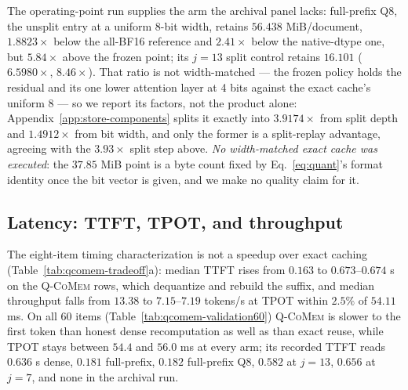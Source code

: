 \documentclass{article}
\newcommand{\qcomem}{\textsc{Q-CoMem}}
\begin{document}
The operating-point run supplies the arm the archival panel lacks: full-prefix
Q8, the unsplit entry at a uniform 8-bit width, retains $56.438$ MiB/document,
$1.8823\times$ below the all-BF16 reference and $2.41\times$ below the
native-dtype one, but $5.84\times$ above the frozen point; its $j=13$ split
control retains $16.101$ ($6.5980\times$, $8.46\times$).  That ratio is not
width-matched --- the frozen policy holds the
residual and its one lower attention layer at 4 bits against the exact cache's
uniform 8 --- so we report its factors, not the product alone:
Appendix~\ref{app:store-components} splits it exactly into $3.9174\times$ from
split depth and $1.4912\times$ from bit width, and only the former is a
split-replay advantage, agreeing with the $3.93\times$ split step above.
\emph{No width-matched exact cache was executed}: the $37.85$ MiB point is a
byte count fixed by Eq.~\ref{eq:quant}'s format identity once the bit vector is
given, and we make no quality claim for it.

\subsection{Latency: TTFT, TPOT, and throughput}
\label{sec:latency}

The eight-item timing characterization is not a speedup over exact caching
(Table~\ref{tab:qcomem-tradeoff}a): median TTFT rises from $0.163$ to
$0.673$--$0.674$ s on the \qcomem{} rows, which dequantize and rebuild the
suffix, and median throughput falls from $13.38$ to $7.15$--$7.19$ tokens/s at
TPOT within $2.5\%$ of $54.11$ ms.  On all 60 items
(Table~\ref{tab:qcomem-validation60}) \qcomem{} is slower to the first token than
honest dense recomputation as well as than exact reuse, while TPOT stays between
$54.4$ and $56.0$ ms at every arm; its recorded TTFT reads $0.636$ s dense,
$0.181$ full-prefix, $0.182$ full-prefix Q8, $0.582$ at $j=13$, $0.656$ at
$j=7$, and none in the archival run.
\end{document}
